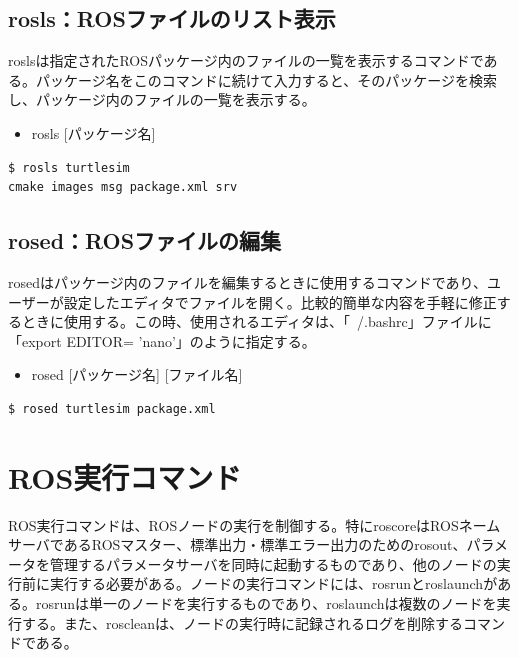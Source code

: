 \subsection{rosls：ROSファイルのリスト表示}

roslsは指定されたROSパッケージ内のファイルの一覧を表示するコマンドである。パッケージ名をこのコマンドに続けて入力すると、そのパッケージを検索し、パッケージ内のファイルの一覧を表示する。\\

\begin{itemize}
\item  rosls [パッケージ名]\\
\end{itemize}

\begin{lstlisting}[language=ROS]
$ rosls turtlesim
cmake images msg package.xml srv
\end{lstlisting}

\subsection{rosed：ROSファイルの編集}

rosedはパッケージ内のファイルを編集するときに使用するコマンドであり、ユーザーが設定したエディタでファイルを開く。比較的簡単な内容を手軽に修正するときに使用する。この時、使用されるエディタは、「~/.bashrc」ファイルに「export EDITOR= 'nano'」のように指定する。\\

\begin{itemize}
\item   rosed [パッケージ名] [ファイル名]\\
\end{itemize}

\begin{lstlisting}[language=ROS]
$ rosed turtlesim package.xml
\end{lstlisting}

\section{ROS実行コマンド}

ROS実行コマンドは、ROSノードの実行を制御する。特にroscoreはROSネームサーバであるROSマスター、標準出力・標準エラー出力のためのrosout、パラメータを管理するパラメータサーバを同時に起動するものであり、他のノードの実行前に実行する必要がある。ノードの実行コマンドには、rosrunとroslaunchがある。rosrunは単一のノードを実行するものであり、roslaunchは複数のノードを実行する。また、roscleanは、ノードの実行時に記録されるログを削除するコマンドである。


